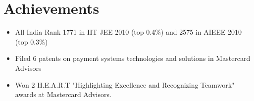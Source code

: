 \documentclass[a4paper,10pt]{article}
\begin{document}
\section*{Achievements}
\begin{itemize}[leftmargin=0.2cm, label={}]
    \item All India Rank 1771 in IIT JEE 2010 (top 0.4\%) and 2575 in AIEEE 2010 (top 0.3\%)
    \item Filed 6 patents on payment systems technologies and solutions in Mastercard Advisors
    \item Won 2 H.E.A.R.T "Highlighting Excellence and Recognizing Teamwork" awards at Mastercard Advisors.
\end{itemize}
\end{document}
